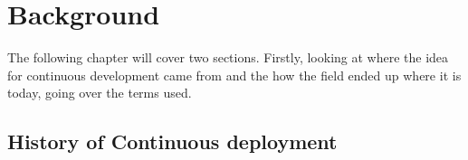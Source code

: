 %
%
%
%
%
%

\section{Background}

The following chapter will cover two sections. Firstly, looking at where the idea for continuous development came from and the how the field ended up where it is today, going over the terms used.

\subsection{History of Continuous deployment}

